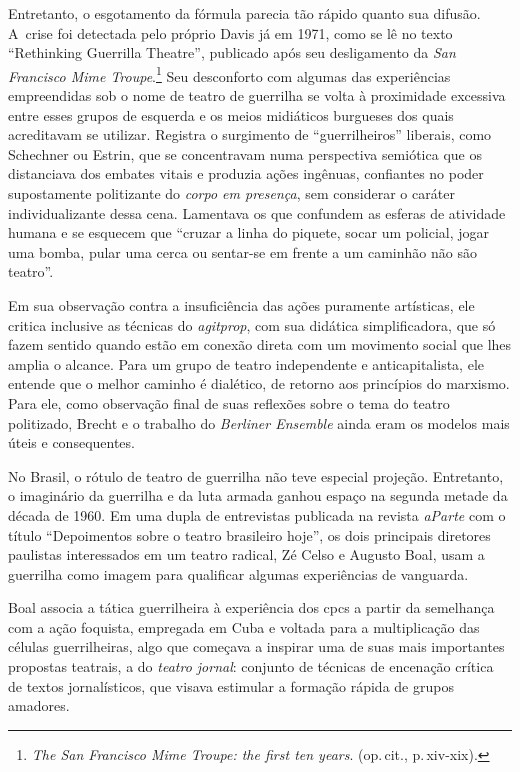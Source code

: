 Entretanto, o esgotamento da fórmula parecia tão rápido quanto sua
difusão. A~crise foi detectada pelo próprio Davis já em 1971, como se lê
no texto “Rethinking Guerrilla Theatre”, publicado após seu
desligamento da {\it San Francisco Mime Troupe}.\footnote{{\it The San Francisco Mime Troupe: the first ten years}.
  (op.\,cit., p.\,xiv-xix).} Seu desconforto com algumas das experiências
empreendidas sob o nome de teatro de guerrilha se volta à
proximidade excessiva entre esses grupos de esquerda e os meios
midiáticos burgueses dos quais acreditavam se utilizar. Registra o
surgimento de “guerrilheiros” liberais, como Schechner ou Estrin, que se
concentravam numa perspectiva semiótica que os distanciava dos embates
vitais e produzia ações ingênuas, confiantes no poder supostamente
politizante do {\it corpo em presença}, sem considerar o caráter
individualizante dessa cena. Lamentava os que confundem as esferas de
atividade humana e se esquecem que “cruzar a linha do piquete, socar um
policial, jogar uma bomba, pular uma cerca ou sentar-se em frente a um
caminhão não são teatro”.

Em sua observação contra a insuficiência das ações puramente artísticas,
ele critica inclusive as técnicas do {\it agitprop}, com sua didática
simplificadora, que só fazem sentido quando estão em conexão direta com
um movimento social que lhes amplia o alcance. Para um grupo de teatro
independente e anticapitalista, ele entende que o melhor caminho é
dialético, de retorno aos princípios do marxismo. Para ele, como
observação final de suas reflexões sobre o tema do teatro politizado,
Brecht e o trabalho do {\it Berliner Ensemble} ainda eram os modelos mais
úteis e consequentes.

\subject{Brasil: a guerrilha no teatro}

No Brasil, o rótulo de teatro de guerrilha não teve especial projeção.
Entretanto, o imaginário da guerrilha e da luta armada ganhou espaço na
segunda metade da década de 1960. Em uma dupla de entrevistas publicada
na revista {\it aParte} com o título “Depoimentos sobre o teatro
brasileiro hoje”, os dois principais diretores paulistas interessados em
um teatro radical, Zé Celso e Augusto Boal, usam a guerrilha como imagem
para qualificar algumas experiências de vanguarda.

Boal associa a tática guerrilheira à experiência dos {\sc cpc}s a partir da
semelhança com a ação foquista, empregada em Cuba e voltada para a
multiplicação das células guerrilheiras, algo que começava
a inspirar uma de suas mais importantes propostas teatrais, a do
{\it teatro jornal}: conjunto de técnicas de encenação crítica de textos
jornalísticos, que visava estimular a formação rápida de grupos
amadores.

